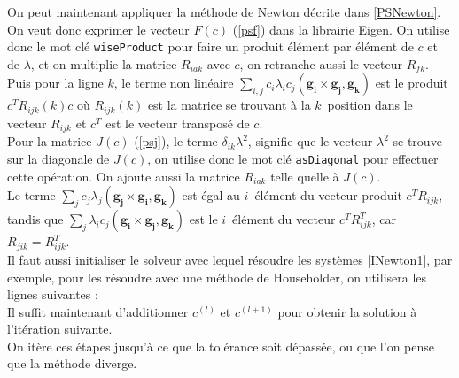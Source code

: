 On peut maintenant appliquer la méthode de Newton décrite dans \ref{PSNewton}. On veut donc exprimer le vecteur $F(c)$ (\ref{psf}) dans la librairie Eigen. On utilise donc le mot clé \texttt{wiseProduct} pour faire un produit élément par élément de $c$ et de $\lambda$, et on multiplie la matrice $R_{iak}$ avec $c$, on retranche aussi le vecteur $R_{fk}$.\\
Puis pour la ligne $k$, le terme non linéaire $\sum_{i,j} c_i\lambda_i c_j (\mathbf{g_i}\times \mathbf{g_j}, \mathbf{g_k})$ est le produit $c^TR_{ijk}(k)c$ où $R_{ijk}(k)$ est la matrice se trouvant à la $k$\ieme\ position dans le vecteur $R_{ijk}$ et $c^T$ est le vecteur transposé de $c$.\\


Pour la matrice $J(c)$ (\ref{psj}), le terme $\delta_{ik}\lambda^2$, signifie que le vecteur $\lambda^2$ se trouve sur la diagonale de $J(c)$, on utilise donc le mot clé \texttt{asDiagonal} pour effectuer cette opération. On ajoute aussi la matrice $R_{iak}$ telle quelle à $J(c)$.\\
Le terme $\sum_j c_j\lambda_j (\mathbf{g_j}\times\mathbf{g_i},\mathbf{g_k})$ est égal au $i$\ieme\ élément du vecteur produit $c^TR_{ijk}$, tandis que $\sum_j\lambda_i c_j (\mathbf{g_i}\times\mathbf{g_j},\mathbf{g_k})$ est le $i$\ieme\ élément du vecteur $c^TR_{ijk}^T$, car $R_{jik}=R_{ijk}^T$.\\


Il faut aussi initialiser le solveur avec lequel résoudre les systèmes \ref{INewton1}, par exemple, pour les résoudre avec une méthode de Householder, on utilisera les lignes suivantes :\\


Il suffit maintenant d'additionner $c^{(l)}$ et $c^{(l+1)}$ pour obtenir la solution à l'itération suivante.\\


On itère ces étapes jusqu'à ce que la tolérance soit dépassée, ou que l'on pense que la méthode diverge.


